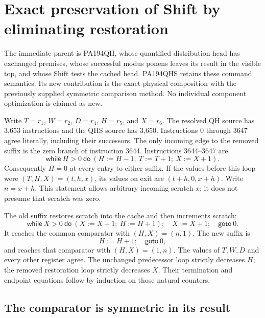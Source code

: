 \section{Exact preservation of Shift by eliminating restoration}
\label{sec:qhs-shift}

The immediate parent is PA194QH, whose quantified distribution head has
exchanged premises, whose successful modus ponens leaves its result in the
visible top, and whose Shift tests the cached head. PA194QHS retains these
command semantics. Its new contribution is the exact physical composition
with the previously supplied symmetric comparison method. No individual
component optimization is claimed as new.

Write $T=r_1$, $W=r_2$, $D=r_4$, $H=r_5$, and $X=r_6$.
The resolved QH source has 3,653 instructions and the QHS source has 3,650.
Instructions 0 through 3647 agree literally, including their successors.
The only incoming edge to the removed suffix is the zero branch of
instruction 3644. Instructions 3644--3647 are
\[
 \mathsf{while}\ H>0\ \mathsf{do}\ (H:=H-1;\ T:=T+1;\ X:=X+1).
\]
Consequently $H=0$ at every entry to either suffix. If the values before
this loop were $(T,H,X)=(t,h,x)$, its values on exit are
$(t+h,0,x+h)$. Write $n=x+h$. This statement allows arbitrary incoming
scratch $x$; it does not presume that scratch was zero.

The old suffix restores scratch into the cache and then increments scratch:
\[
 \mathsf{while}\ X>0\ \mathsf{do}\ (X:=X-1;\ H:=H+1);
 \quad X:=X+1;\quad \mathsf{goto}\ 0.
\]
It reaches the common comparator with $(H,X)=(n,1)$. The new suffix is
\[
 H:=H+1;\quad \mathsf{goto}\ 0,
\]
and reaches that comparator with $(H,X)=(1,n)$. The values of $T,W,D$
and every other register agree. The unchanged predecessor loop strictly
decreases $H$; the removed restoration loop strictly decreases $X$.
Their termination and endpoint equations follow by induction on those
natural counters.

\subsection{The comparator is symmetric in its result}

